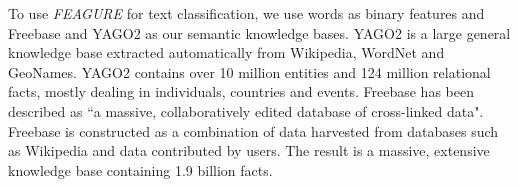 \documentclass[twoside,11pt]{article}
\theoremstyle{definition}
\begin{document}



To use \emph{FEAGURE} for text classification, we use words as binary features and Freebase and YAGO2 as our semantic knowledge bases.
YAGO2 \cite{hoffart2013yago2} is a large general knowledge base extracted automatically from Wikipedia, WordNet and GeoNames.
YAGO2 contains over 10 million entities and 124 million relational facts, mostly dealing in individuals, countries and events.
Freebase \cite{bollacker2008freebase} has been described as ``a massive, collaboratively edited database of cross-linked data". Freebase is constructed as a combination of data harvested from databases such as Wikipedia and data contributed by users. The result is a massive, extensive knowledge base containing 1.9 billion facts. 
\end{document}
